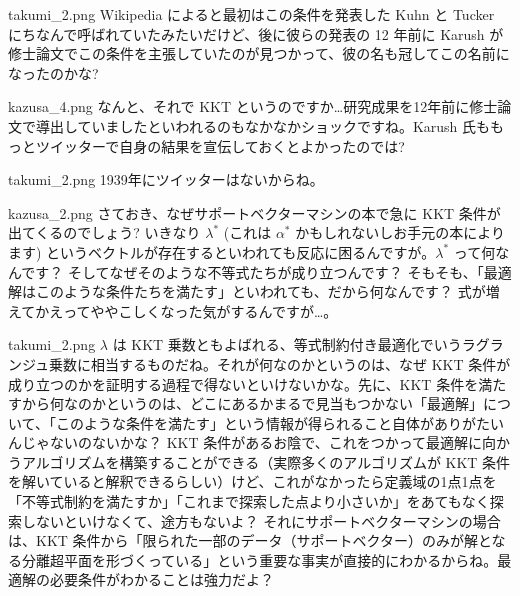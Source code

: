 \documentclass[b5paper,xelatex,ja=standard,10pt]{bxjsarticle}
\begin{document}
\begin{SERIFU}[colback=PaleGold, colbacktitle=PaleGold2]{takumi_2.png}
Wikipedia によると最初はこの条件を発表した Kuhn と Tucker にちなんで呼ばれていたみたいだけど、後に彼らの発表の 12 年前に Karush が修士論文でこの条件を主張していたのが見つかって、彼の名も冠してこの名前になったのかな?
\end{SERIFU}

\begin{SERIFU}[colback=PaleIris, colbacktitle=PaleIris2]{kazusa_4.png}
なんと、それで KKT というのですか…研究成果を12年前に修士論文で導出していましたといわれるのもなかなかショックですね。Karush 氏ももっとツイッターで自身の結果を宣伝しておくとよかったのでは?
\end{SERIFU}

\begin{SERIFU}[colback=PaleGold, colbacktitle=PaleGold2]{takumi_2.png}
1939年にツイッターはないからね。
\end{SERIFU}

\begin{SERIFU}[colback=PaleIris, colbacktitle=PaleIris2]{kazusa_2.png}
さておき、なぜサポートベクターマシンの本で急に KKT 条件が出てくるのでしょう? いきなり $\lambda^\ast$ (これは $\alpha^\ast$ かもしれないしお手元の本によります) というベクトルが存在するといわれても反応に困るんですが。$\lambda^\ast$ って何なんです？ そしてなぜそのような不等式たちが成り立つんです？ そもそも、「最適解はこのような条件たちを満たす」といわれても、だから何なんです？ 式が増えてかえってややこしくなった気がするんですが…。
\end{SERIFU}

\begin{SERIFU}[colback=PaleGold, colbacktitle=PaleGold2]{takumi_2.png}
$\lambda$ は KKT 乗数ともよばれる、等式制約付き最適化でいうラグランジュ乗数に相当するものだね。それが何なのかというのは、なぜ KKT 条件が成り立つのかを証明する過程で得ないといけないかな。先に、KKT 条件を満たすから何なのかというのは、どこにあるかまるで見当もつかない「最適解」について、「このような条件を満たす」という情報が得られること自体がありがたいんじゃないのないかな？ KKT 条件があるお陰で、これをつかって最適解に向かうアルゴリズムを構築することができる（実際多くのアルゴリズムが KKT 条件を解いていると解釈できるらしい）けど、これがなかったら定義域の1点1点を「不等式制約を満たすか」「これまで探索した点より小さいか」をあてもなく探索しないといけなくて、途方もないよ？ それにサポートベクターマシンの場合は、KKT 条件から「限られた一部のデータ（サポートベクター）のみが解となる分離超平面を形づくっている」という重要な事実が直接的にわかるからね。最適解の必要条件がわかることは強力だよ？
\end{SERIFU}
\end{document}
